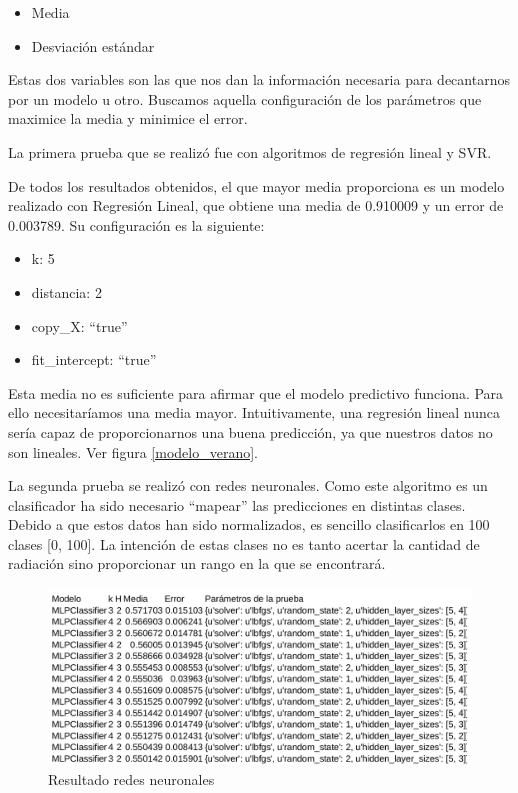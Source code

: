 \begin{itemize}
	\item Media
	\item Desviación estándar
\end{itemize}

Estas dos variables son las que nos dan la información necesaria para decantarnos por un modelo u otro. Buscamos aquella configuración de los parámetros que maximice la media y minimice el error.

La primera prueba que se realizó fue con algoritmos de regresión lineal y SVR.

De todos los resultados obtenidos, el que mayor media proporciona es un modelo realizado con Regresión Lineal, que obtiene una media de 0.910009 y un error de 0.003789. Su configuración es la siguiente:

\begin{itemize}
	\item k: 5
	\item distancia: 2
	\item copy\_X: ``true''
	\item fit\_intercept: ``true''
\end{itemize}

Esta media no es suficiente para afirmar que el modelo predictivo funciona. Para ello necesitaríamos una media mayor. Intuitivamente, una regresión lineal nunca sería capaz de proporcionarnos una buena predicción, ya que nuestros datos no son lineales. Ver figura \ref{modelo_verano}.

La segunda prueba se realizó con redes neuronales. Como este algoritmo es un clasificador ha sido necesario ``mapear'' las predicciones en distintas clases. Debido a que estos datos han sido normalizados, es sencillo clasificarlos en 100 clases [0, 100]. La intención de estas clases no es tanto acertar la cantidad de radiación sino proporcionar un rango en la que se encontrará.

\begin{figure}[htb]
	\begin{center}
		\includegraphics[width=14cm]{figures/resultado_mlp.png}
		\caption{Resultado redes neuronales \label{resultado_mlp}}
	\end{center}
\end{figure}

